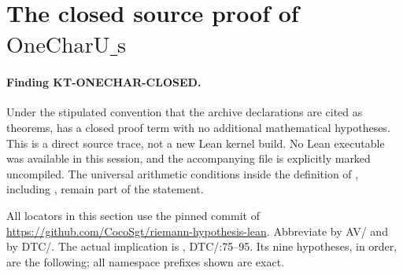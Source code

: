 \section{The closed source proof of \texorpdfstring{$\mathrm{OneCharU\_s}$}{OneCharU\_s}}
\label{sec:kt-onechar-closed}

\paragraph{Finding KT-ONECHAR-CLOSED.}
Under the stipulated convention that the archive declarations are cited as
theorems,  has a closed proof term with
no additional mathematical hypotheses.  This is a direct source trace,
not a new Lean kernel build.  No Lean executable was available in this
session, and the accompanying file
 is explicitly marked uncompiled.
The universal arithmetic conditions inside the definition of
, including , remain part of the statement.

All locators in this section use the pinned commit
 of
\url{https://github.com/CocoSgt/riemann-hypothesis-lean}.
Abbreviate
by AV/ and
by DTC/.  The actual implication is
,
DTC/:75--95.  Its nine hypotheses, in order, are
the following; all namespace prefixes shown are exact.

